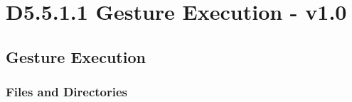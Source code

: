 \documentclass{CSSRforAfrica}
\begin{document}

\section{D5.5.1.1 Gesture Execution - v1.0} 
\subsection{Gesture Execution} 
\label{subsection:gesture_execution}

\subsubsection{Files and Directories}
 
\end{document}
